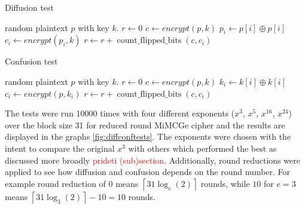 \documentclass{Resources/UoBLab1}
\theoremstyle{definition}
\begin{document}
\begin{minipage}{0.46\textwidth}
\begin{algorithm}[H]
    \caption{Diffusion test}\label{alg:diff}
    \begin{algorithmic}
        \Require random plaintext $p$ with key $k$.
        \State $r \gets 0$
        \State $c \gets encrypt(p, k)$
            \State $p_i \gets p[i] \oplus p[i]$ 
            \State $c_i \gets encrypt(p_i, k)$
            \State $r \gets r + \operatorname{count\_flipped\_bits}(c, c_i)$
        \EndFor
    \end{algorithmic}
\end{algorithm}
\end{minipage}
\hfill
\begin{minipage}{0.46\textwidth}
\begin{algorithm}[H]
    \caption{Confusion test}\label{alg:conf}
    \begin{algorithmic}
        \Require random plaintext $p$ with key $k$.
        \State $r \gets 0$
        \State $c \gets encrypt(p, k)$
            \State $k_i \gets k[i] \oplus k[i]$ 
            \State $c_i \gets encrypt(p, k_i)$
            \State $r \gets r + \operatorname{count\_flipped\_bits}(c, c_i)$
        \EndFor
    \end{algorithmic}
\end{algorithm}
\end{minipage}

The tests were run 10000 times with four different exponents ($x^3$, $x^5$, $x^{16}$, $x^{24}$) over the block size 31 for reduced round MiMCGe cipher and the results are displayed in the graphs \ref{fig:diffconftests}. The exponents were chosen with the intent to compare the original $x^3$ with others which performed the best as discussed more broadly \textcolor{red}{prideti (sub)section}. Additionally, round reductions were applied to see how diffusion and confusion depends on the round number. For example round reduction of $0$ means $\left\lceil 31\log_e(2) \right\rceil$ rounds, while $10$ for $e = 3$ means \(\left\lceil 31\log_3(2) \right\rceil - 10 = 10\) rounds.

%         
%         
\end{document}
